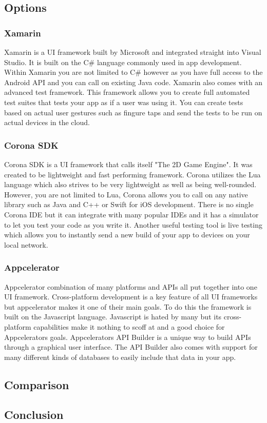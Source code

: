 \documentclass[onecolumn, draftclsnofoot,10pt, compsoc]{IEEEtran}
\begin{document}
	\subsection{Options}
		\subsubsection{Xamarin}
			Xamarin is a UI framework built by Microsoft and integrated straight into Visual Studio.
			It is built on the C\# language commonly used in app development.
			Within Xamarin you are not limited to C\# however as you have full access to the Android API and you can call on existing Java code\cite{xamarin_platform}.
			Xamarin also comes with an advanced test framework.
			This framework allows you to create full automated test suites that tests your app as if a user was using it.
			You can create tests based on actual user gestures such as fingure taps and send the tests to be run on actual devices in the cloud\cite{xamarin_test}.

		\subsubsection{Corona SDK}
			Corona SDK is a UI framework that calls itself "The 2D Game Engine".
			It was created to be lightweight and fast performing framework.
			Corona utilizes the Lua language which also strives to be very lightweight as well as being well-rounded.
			However, you are not limited to Lua, Corona allows you to call on any native library such as Java and C++ or Swift for iOS development.
			There is no single Corona IDE but it can integrate with many popular IDEs and it has a simulator to let you test your code as you write it.
			Another useful testing tool is live testing which allows you to instantly send a new build of your app to devices on your local network\cite{corona_overview}.

		\subsubsection{Appcelerator}
			Appcelerator combination of many platforms and APIs all put together into one UI framework.
			Cross-platform development is a key feature of all UI frameworks but appcelerator makes it one of their main goals.
			To do this the framework is built on the Javascript language.
			Javascript is hated by many but its cross-platform capabilities make it nothing to scoff at and a good choice for Appcelerators goals.
			Appcelerators API Builder is a unique way to build APIs through a graphical user interface.
			The API Builder also comes with support for many different kinds of databases to easily include that data in your app\cite{appcelerator_overview}.


	\subsection{Comparison}


	\subsection{Conclusion}



\end{document}
